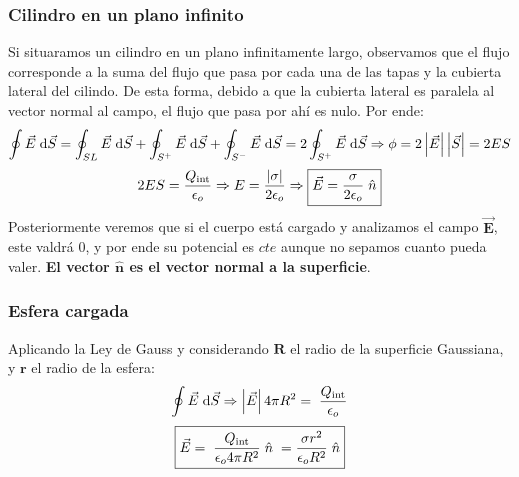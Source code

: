 \subsubsection{Cilindro en un plano infinito}
\noindent Si situaramos un cilindro en un plano infinitamente largo, observamos que el flujo corresponde a la suma del flujo que pasa por cada una de las tapas y la cubierta lateral del cilindo. De esta forma, debido a que la cubierta lateral es paralela al vector normal al campo, el flujo que pasa por ahí es nulo. Por ende:
\[
        \oint \vec{E}\hspace{1mm}\mathrm{d} \vec{S} = \oint_{SL}\vec{E}\hspace{1mm}\mathrm{d} \vec{S} +\oint_{S^+}\vec{E}\hspace{1mm}\mathrm{d} \vec{S}+\oint_{S^-}\vec{E}\hspace{1mm}\mathrm{d} \vec{S} =
        2 \oint_{S^+} \vec{E}\hspace{1mm}\mathrm{d} \vec{S} \Rightarrow \phi =2\left | \vec{E} \right |\left | \vec{S} \right | = 2ES
\]
\[
        2ES = \frac{Q_{\textnormal{int}}}{\epsilon_o} \Rightarrow E = \frac{\left | \sigma \right |}{2\epsilon_o} \Rightarrow \boxed{\vec{E} = \frac{\sigma}{2\epsilon_o}\hspace{1mm}\hat{n}}
\]
Posteriormente veremos que si el cuerpo está cargado y analizamos el campo \(\bm{\vec{E}}\), este valdrá 0, y por ende su potencial es \(cte\) aunque no sepamos cuanto pueda valer. \textbf{El vector \(\bm{\hat{n}}\) es el vector normal a la superficie}.
\subsubsection{Esfera cargada}
\noindent Aplicando la Ley de Gauss y considerando \(\bm{R}\) el radio de la superficie Gaussiana, y \(\bm{r}\) el radio de la esfera:
\[
        \oint \vec{E} \hspace{1mm} \mathrm{d}\vec{S} \Rightarrow \left | \vec{E} \right | 4\pi R^2 = \hspace{1mm} \frac{Q_{\textnormal{int}}}{\epsilon_o}
\]
\[
        \boxed{\vec{E}  = \hspace{1mm} \frac{Q_{\textnormal{int}}}{\epsilon_o4\pi R^2} \hspace{1mm}\hat{n} \hspace{1mm} = \frac{\sigma r^2}{\epsilon_o R^2} \hspace{1mm}\hat{n}}
\]

